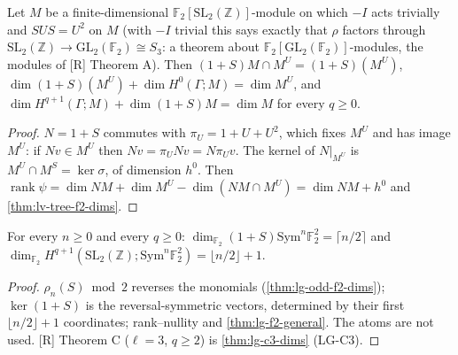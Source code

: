 \begin{theorem}[Characteristic $2$: $\dim H^{q+1}+\dim(1+S)M=\dim M$ without freeness]\label{thm:lg-f2-general}
  \leanok
  Let $M$ be a finite-dimensional $\mathbb F_2[\mathrm{SL}_2(\mathbb Z)]$-module on which $-I$ acts trivially and $SUS=U^2$ on $M$
  (with $-I$ trivial this says exactly that $\rho$ factors through $\mathrm{SL}_2(\mathbb Z)\to\mathrm{GL}_2(\mathbb F_2)\cong S_3$: a theorem
  about $\mathbb F_2[\mathrm{GL}_2(\mathbb F_2)]$-modules, the modules of [R] Theorem A).  Then
  $(1+S)M\cap M^U=(1+S)(M^U)$, $\dim(1+S)(M^U)+\dim H^0(\Gamma;M)=\dim M^U$, and
  $\dim H^{q+1}(\Gamma;M)+\dim(1+S)M=\dim M$ for every $q\ge0$.
\end{theorem}
\begin{proof}
  \leanok
  $N=1+S$ commutes with $\pi_U=1+U+U^2$, which fixes $M^U$ and has image $M^U$: if $Nv\in M^U$ then $Nv=\pi_UNv=N\pi_Uv$.  The kernel of
  $N|_{M^U}$ is $M^U\cap M^S=\ker\sigma$, of dimension $h^0$.  Then $\operatorname{rank}\psi=\dim NM+\dim M^U-\dim(NM\cap M^U)=\dim NM+h^0$
  and \ref{thm:lv-tree-f2-dims}.
\end{proof}

\begin{theorem}[{[R]} Theorem A: $\dim_{\mathbb F_2}H^q(\Gamma;\mathrm{Sym}^n\mathbb F_2^2)=\lfloor n/2\rfloor+1$, every $n$, every $q\ge1$]\label{thm:lg-thmA-dims}
  \leanok
  For every $n\ge0$ and every $q\ge0$: $\dim_{\mathbb F_2}(1+S)\mathrm{Sym}^n\mathbb F_2^2=\lceil n/2\rceil$ and
  $\dim_{\mathbb F_2}H^{q+1}(\mathrm{SL}_2(\mathbb Z);\mathrm{Sym}^n\mathbb F_2^2)=\lfloor n/2\rfloor+1$.
\end{theorem}
\begin{proof}
  \leanok
  $\rho_n(S)\bmod 2$ reverses the monomials (\ref{thm:lg-odd-f2-dims}); $\ker(1+S)$ is the reversal-symmetric vectors, determined by
  their first $\lfloor n/2\rfloor+1$ coordinates; rank--nullity and \ref{thm:lg-f2-general}.  The atoms are not used.  [R] Theorem C
  ($\ell=3$, $q\ge2$) is \ref{thm:lg-c3-dims} (LG-C3).
\end{proof}

